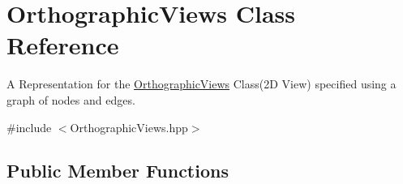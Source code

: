 \hypertarget{class_orthographic_views}{}\section{Orthographic\+Views Class Reference}
\label{class_orthographic_views}


A Representation for the \mbox{\hyperlink{class_orthographic_views}{Orthographic\+Views}} Class(2\+D View) specified using a graph of nodes and edges.  




{\ttfamily \#include $<$Orthographic\+Views.\+hpp$>$}

\subsection*{Public Member Functions}
